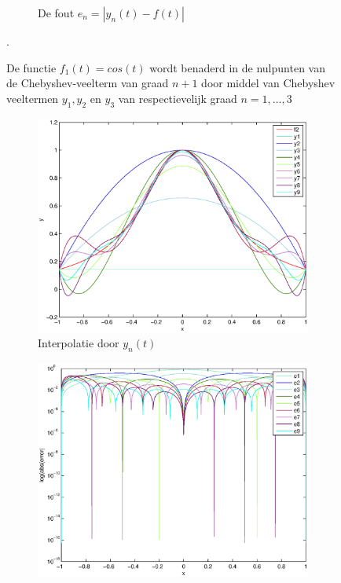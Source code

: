 \documentclass[a4paper]{article}
\begin{document}
\begin{figure}
\begin{subfigure}[t]{0.45\textwidth}
        \caption{De fout $e_{n} = |y_{n}(t)-f(t)|$}
        \label{fig:cheb_cos_error}
    \end{subfigure}
    \caption{De functie $f_{1}(t) = cos(t)$ wordt benaderd in de nulpunten van de Chebyshev-veelterm van graad $n+1$ door middel van Chebyshev veeltermen $y_{1},y_{2}$ en $y_{3}$ van respectievelijk graad $n=1,\dots,3$}\label{fig:cheb_cos}.
\end{figure}

\begin{figure}
    \centering
    \begin{subfigure}[t]{\textwidth}
        \centering
        \includegraphics[width=\textwidth]{Jona/linspace_f2_interpolation.eps}
        \caption{Interpolatie door $y_{n}(t)$}
        \label{fig:lin_f2_interpol}
    \end{subfigure}
    \begin{subfigure}[t]{\textwidth}
        \centering
        \includegraphics[width=\textwidth]{Jona/linspace_f2_error.eps}

\end{subfigure}
\end{figure}
\end{document}
